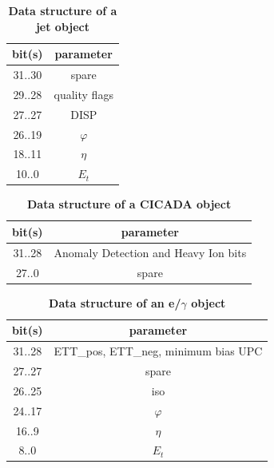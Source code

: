 \documentclass{cmspaper}
\begin{document}
\begin{table}[ht]
\caption{\bf Data structure of a jet object}
\vspace{5mm}
\centering
\begin{tabular}{|c|c|}\hline
bit(s) & parameter \\\hline\hline
31..30 & spare \\
29..28 & quality flags \\
27..27 & DISP \\
26..19 & $\varphi$ \\
18..11 & $\eta$ \\
10..0 & $E_t$ \\\hline
\end{tabular}
\label{table:jet_object}
\end{table}

\begin{table}[ht]
\caption{\bf Data structure of a CICADA object}
\vspace{5mm}
\centering
\begin{tabular}{|c|c|}\hline
bit(s) & parameter \\\hline\hline
31..28 & Anomaly Detection and Heavy Ion bits \\
27..0 & spare \\\hline
\end{tabular}
\label{table:cicada_object}
\end{table}

\begin{table}[ht]
\caption{\bf Data structure of an e/$\gamma$ object}
\vspace{5mm}
\centering
\begin{tabular}{|c|c|}\hline
bit(s) & parameter \\\hline\hline
31..28 & ETT\_pos, ETT\_neg, minimum bias UPC \\
27..27 & spare \\
26..25 & iso \\
24..17 & $\varphi$ \\
16..9 & $\eta$ \\
8..0 & $E_t$ \\\hline
\end{tabular}
\label{table:egamma_object}
\end{table}
\end{document}
